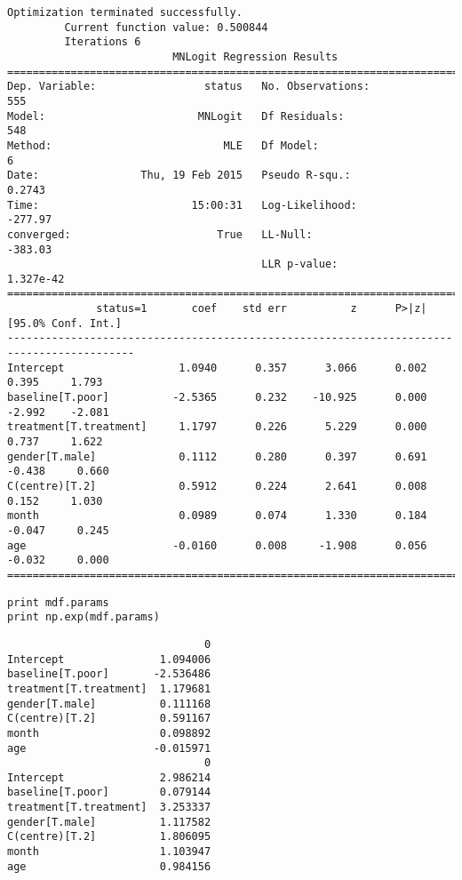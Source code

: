 \documentclass[12pt,fleqn]{article}\usepackage{../common}
\begin{document}
\begin{verbatim}
Optimization terminated successfully.
         Current function value: 0.500844
         Iterations 6
                          MNLogit Regression Results                          
==============================================================================
Dep. Variable:                 status   No. Observations:                  555
Model:                        MNLogit   Df Residuals:                      548
Method:                           MLE   Df Model:                            6
Date:                Thu, 19 Feb 2015   Pseudo R-squ.:                  0.2743
Time:                        15:00:31   Log-Likelihood:                -277.97
converged:                       True   LL-Null:                       -383.03
                                        LLR p-value:                 1.327e-42
==========================================================================================
              status=1       coef    std err          z      P>|z|      [95.0% Conf. Int.]
------------------------------------------------------------------------------------------
Intercept                  1.0940      0.357      3.066      0.002         0.395     1.793
baseline[T.poor]          -2.5365      0.232    -10.925      0.000        -2.992    -2.081
treatment[T.treatment]     1.1797      0.226      5.229      0.000         0.737     1.622
gender[T.male]             0.1112      0.280      0.397      0.691        -0.438     0.660
C(centre)[T.2]             0.5912      0.224      2.641      0.008         0.152     1.030
month                      0.0989      0.074      1.330      0.184        -0.047     0.245
age                       -0.0160      0.008     -1.908      0.056        -0.032     0.000
==========================================================================================
\end{verbatim}


\begin{verbatim}
print mdf.params
print np.exp(mdf.params)
\end{verbatim}

\begin{verbatim}
                               0
Intercept               1.094006
baseline[T.poor]       -2.536486
treatment[T.treatment]  1.179681
gender[T.male]          0.111168
C(centre)[T.2]          0.591167
month                   0.098892
age                    -0.015971
                               0
Intercept               2.986214
baseline[T.poor]        0.079144
treatment[T.treatment]  3.253337
gender[T.male]          1.117582
C(centre)[T.2]          1.806095
month                   1.103947
age                     0.984156
\end{verbatim}
\end{document}

